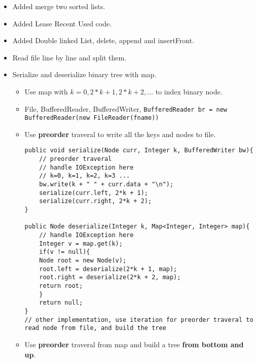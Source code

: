 \documentclass[11pt]{article}
\begin{document}
\begin{itemize}
\begin{verbatim}
// second implementation
class Person implements Comparable<Person>{
    String firstName;
    String lastName;
    public Person(String f, String l){
    this.firstName = f;
    this.lastName = l; 
   }
   public int compareTo(Person other){
     return this.firstName.compareTo(other.firstName);
   }
}

PriorityQueue queue = new PriorityQueue((\a, b) -> a.firstName.compareTo(b.firstName));
queue.add(new Person("David", "lee"));
queue.add(new Person("Tommy", "kee"));
queue.add(new Person("Jacky", "kuu"));
while(!queue.isEmpty()){
   Person p = queue.remove();
   System.out.print(p.firstName);
}

// use Comparator interface,                                
class PersonCmp implements Comparator<Person>{             
     public int compare(Person p1, Person p2){             
       return p1.firstName.compareTo(p2.firstName);        
     }                                                     
}                                                          
Collections.sort(new PersonCmp());                         
\end{verbatim}
\item Added merge two sorted lists.
\item Added Lease Recent Used code.
\item Added Double linked List, delete, append and insertFront.
\item Read file line by line and split them.
\item Serialize and deserialize binary tree with map.
\begin{itemize}
\item Use map with \(k=0, 2*k + 1, 2*k + 2, \dots\) to index binary node.
\item File, BufferedReader, BufferedWriter, \texttt{BufferedReader br = new BufferedReader(new FileReader(fname))}
\item Use \textbf{preorder} traveral to write all the keys and nodes to file.
\begin{verbatim}
public void serialize(Node curr, Integer k, BufferedWriter bw){
    // preorder traveral
    // handle IOException here
    // k=0, k=1, k=2, k=3 ...
    bw.write(k + " " + curr.data + "\n");
    serialize(curr.left, 2*k + 1);
    serialize(curr.right, 2*k + 2);
}

public Node deserialize(Integer k, Map<Integer, Integer> map){
    // handle IOException here
    Integer v = map.get(k);
    if(v != null){
	Node root = new Node(v);
	root.left = deserialize(2*k + 1, map);
	root.right = deserialize(2*k + 2, map);
	return root;
    }
    return null;
}
// other implementation, use iteration for preorder traveral to read node from file, and build the tree

\end{verbatim}
\item Use \textbf{preorder} traveral from map and build a tree \textbf{from bottom and up}.
\end{itemize}
\end{itemize}
\end{document}
